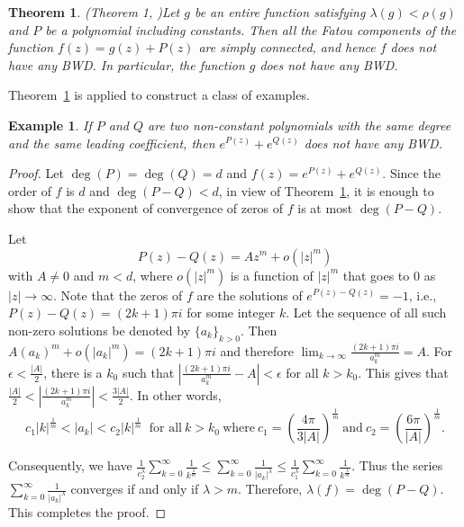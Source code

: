 \documentclass[11pt,a4paper]{article}
\newtheorem{theorem}{Theorem}[section]
\newtheorem{example}{Example}[section]
\begin{document}
	\begin{theorem}(Theorem 1, \cite{CaoWang 2002})\label{Cao-Wang-NoBWD}
		Let  $g$ be an entire function satisfying $\lambda(g)<\rho(g)$ and  $P$ be a polynomial including constants. Then  all the Fatou components of the function  
		$f(z)=g(z)+P(z)$ are simply connected, and hence $f$ does not have  any BWD. In particular,  the function $g$ does not have any BWD.
	\end{theorem}
  Theorem~\ref{Cao-Wang-NoBWD} is applied to construct a class of examples.
\begin{example}\label{Lem5.1}
	If $P$ and $Q$ are two non-constant polynomials with the same degree and the same leading coefficient, then $e^{P(z)}+e^{Q(z)}$ does not have any BWD.
	\end{example}
 
\begin{proof}
Let  $\deg(P)=\deg(Q)=d$ and $f(z)=e^{P(z)}+e^{Q(z)}$. Since the order of $f$ is $d$ and  $\deg(P-Q) < d$, in view of Theorem~\ref{Cao-Wang-NoBWD}, it is enough to show that the exponent of convergence of zeros of $f$ is at most $\deg(P-Q)$.
	
Let  \begin{equation}\label{Equ 22}
	 P(z)-Q(z)=Az^m+o(|z|^m)
	\end{equation} with $A\neq 0$ and $m<d$, where $o(|z|^m)$ is a function of $|z|^m$ that goes to $0$ as $|z| \to \infty$. Note that the zeros of $f$ are the solutions of $e^{ P(z)-Q(z)}=-1$, i.e.,  $ P(z)-Q(z)=(2k+1)\pi i$ for some integer $k$. Let the sequence of all such non-zero solutions be denoted by $\{a_k\}_{k>0}$. Then $A (a_k)^m +o(|a_k|^m)=(2k+1)\pi i$ and therefore $\lim_{ k\to \infty} \frac{(2k+1)\pi i}{a_k ^m}=A$. For $\epsilon < \frac{|A|}{2}$, there is a $k_0$ such that $| \frac{(2k+1)\pi i}{a_k ^m}-A | < \epsilon$ for all $k >k_0$. This gives that $\frac{|A|}{2} < |\frac{(2k+1)\pi i}{a_k ^m}|< \frac{3|A|}{2}$. In other words, $$c_1 |k|^{\frac{1}{m}}< |a_k| <c_2 |k|^{\frac{1}{m}} ~\mbox{ for all}~ k >k_0~\mbox{where}~ c_1=\left(\frac{4 \pi}{3|A|}\right)^{\frac{1}{m} }~\mbox{and}~c_2= \left(\frac{6 \pi}{|A|}\right)^{\frac{1}{m}}.$$ 
	
 Consequently, we have $ \frac{1}{c_{2}^\lambda} \sum_{k=0}^{\infty}\frac{1}{k^\frac{\lambda}{m}} \leq   \sum_{k=0}^{\infty}\frac{1}{|a_k|^\lambda}\leq\frac{1}{c_{1}^\lambda} \sum_{k=0}^{\infty}\frac{1}{k^\frac{\lambda}{m}}$. Thus the series $\sum_{k=0}^{\infty}\frac{1}{|a_k|^\lambda}$ converges if and only  if   $\lambda>m$. Therefore, $\lambda(f) =\deg(P-Q)$. This completes the proof.
\end{proof}
\end{document}
